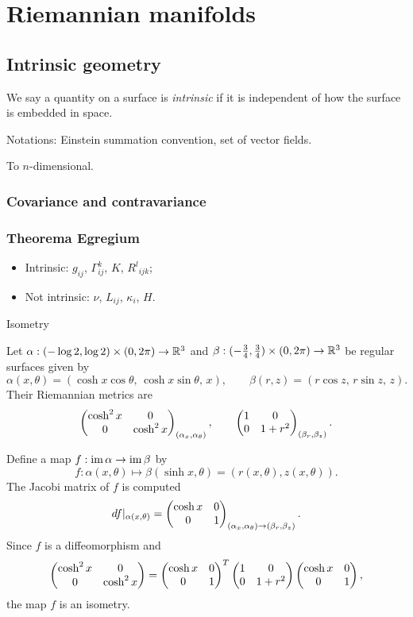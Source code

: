 \documentclass{../note}
\def\a{\alpha}
\begin{document}
\part{Riemannian manifolds}


\chapter{Intrinsic geometry}

We say a quantity on a surface is \emph{intrinsic} if it is independent of how the surface is embedded in space.

Notations: Einstein summation convention, set of vector fields.

To $n$-dimensional.

\section{Covariance and contravariance}


\section{Theorema Egregium}

\begin{itemize}
\item Intrinsic: $g_{ij}$, $\Gamma_{ij}^k$, $K$, ${R^l}_{ijk}$;
\item Not intrinsic: $\nu$, $L_{ij}$, $\kappa_i$, $H$.
\end{itemize}

Isometry
\begin{ex}
Let $\a:(-\log2,\log2)\times(0,2\pi)\to\R^3$ and $\beta:(-\frac34,\frac34)\times(0,2\pi)\to\mathbb{R}^3$ be regular surfaces given by
\[\a(x,\theta)=(\cosh x\cos\theta,\,\cosh x\sin\theta,\,x),\qquad
\beta(r,z)=(r\cos z,\,r\sin z,\,z).\]
Their Riemannian metrics are
\[\mat{\cosh^2x&0\\0&\cosh^2x}_{(\a_x,\a_\theta)},\qquad\mat{1&0\\0&1+r^2}_{(\beta_r,\beta_z)}.\]

Define a map $f:\im\a\to\im\beta$ by
\[f:\a(x,\theta)\mapsto\beta(\sinh x,\theta)=(r(x,\theta),z(x,\theta)).\]
The Jacobi matrix of $f$ is computed
\[df|_{\a(x,\theta)}=\mat{\cosh x&0\\0&1}_{(\a_x,\a_\theta)\to(\beta_r,\beta_z)}.\]
Since $f$ is a diffeomorphism and
\[\begin{pmatrix}\cosh^2x&0\\0&\cosh^2x\end{pmatrix}=\begin{pmatrix}\cosh x&0\\0&1\end{pmatrix}^T\begin{pmatrix}1&0\\0&1+r^2\end{pmatrix}\begin{pmatrix}\cosh x&0\\0&1\end{pmatrix},\]
the map $f$ is an isometry.
\end{ex}
\end{document}
